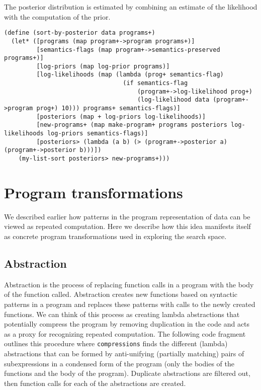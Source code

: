 \documentclass[a4paper,10pt]{article}
\begin{document}
The posterior distribution is estimated by combining an estimate of the likelihood with the computation of the prior.  
\begin{lstlisting}[frame=trBL]
(define (sort-by-posterior data programs+)
  (let* ([programs (map program+->program programs+)]
         [semantics-flags (map program+->semantics-preserved programs+)]
         [log-priors (map log-prior programs)]
         [log-likelihoods (map (lambda (prog+ semantics-flag)
                                 (if semantics-flag
                                     (program+->log-likelihood prog+)
                                     (log-likelihood data (program+->program prog+) 10))) programs+ semantics-flags)]
         [posteriors (map + log-priors log-likelihoods)] 
         [new-programs+ (map make-program+ programs posteriors log-likelihoods log-priors semantics-flags)]
         [posteriors> (lambda (a b) (> (program+->posterior a) (program+->posterior b)))])
    (my-list-sort posteriors> new-programs+)))
\end{lstlisting}


\newpage
\section{Program transformations}
We described earlier how patterns in the program representation of data can be viewed as repeated computation.  Here we describe how this idea manifests itself as concrete program transformations used in exploring the search space.

\subsection{Abstraction}
Abstraction is the process of replacing function calls in a program with the body of the function called. Abstraction creates new functions based on syntactic patterns in a program and replaces these patterns with calls to the newly created functions.  We can think of this process as creating lambda abstractions that potentially compress the program by removing duplication in the code and acts as a proxy for recognizing repeated computation.  The following code fragment outlines this procedure where \texttt{compressions} finds the different (lambda) abstractions that can be formed by anti-unifying (partially matching) pairs of subexpressions in a condensed form of the program (only the bodies of the functions and the body of the program).  Duplicate abstractions are filtered out, then function calls for each of the abstractions are created.
\end{document}
